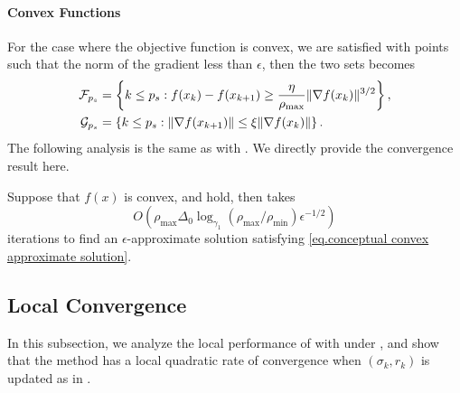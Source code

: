 \paragraph{Convex Functions}
For the case where the objective function is convex, we are satisfied with points such that the norm of the gradient less than $\epsilon$, then the two sets becomes 
\begin{equation*}
    \begin{aligned}
        \mathcal{F}_{p_s} & = \left \{k\leq p_s: f(x_k)-f(x_{k+1})\geq \frac{\eta}{\rho_{\max}}\|\nabla f(x_k)\|^{3/2}\right\}, \\
        \mathcal{G}_{p_s} & = \left \{k\leq p_s: \|\nabla f(x_{k+1})\|\leq \xi\|\nabla f(x_k)\| \right \}.
    \end{aligned}
\end{equation*}
The following analysis is the same as  with . We directly provide the convergence result here.


\begin{theorem}
    \label{remark.adaptive convex}
    Suppose that $f(x)$ is convex,  and  hold, then  takes
    \begin{equation}
        \label{eq.adaptive convex}
        O\left(\rho_{\max}\Delta_0\log_{\gamma_1} \left(\rho_{\max}/\rho_{\min}\right )\epsilon^{-1/2} \right)
    \end{equation}
    iterations to find an $\epsilon$-approximate solution satisfying \eqref{eq.conceptual convex approximate solution}.
\end{theorem}
\subsection{Local Convergence}
In this subsection, we analyze the local performance of  with  under , and show that the method has a local quadratic rate of convergence when $(\sigma_k, r_k)$ is updated as in .

